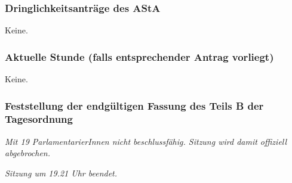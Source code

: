 \documentclass[ngerman,headheight=70pt]{scrartcl}
\begin{document}
    \subsubsection{Dringlichkeitsanträge des AStA}

    Keine.

    \subsubsection{Aktuelle Stunde (falls entsprechender Antrag vorliegt)}

    Keine.

    \subsubsection{Feststellung der endgültigen Fassung des Teils B der Tagesordnung}

    \textit{Mit 19 ParlamentarierInnen nicht beschlussfähig. Sitzung wird damit
    offiziell abgebrochen.}

    \textit{Sitzung um 19.21 Uhr beendet.}
\end{document}
